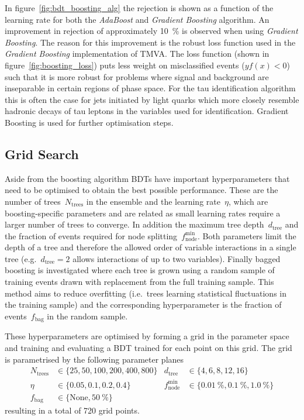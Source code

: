 In figure~\ref{fig:bdt_boosting_alg} the rejection is shown as a function of the
learning rate for both the \emph{AdaBoost} and \emph{Gradient Boosting}
algorithm. An improvement in rejection of approximately \SI{10}{\percent} is
observed when using \emph{Gradient Boosting}. The reason for this improvement is
the robust loss function used in the \emph{Gradient Boosting} implementation of
TMVA. The loss function (shown in figure~\ref{fig:boosting_loss}) puts less
weight on misclassified events ($y f(x) < 0$) such that it is more robust for
problems where signal and background are inseparable in certain regions of phase
space. For the tau identification algorithm this is often the case for jets
initiated by light quarks which more closely resemble hadronic decays of tau
leptons in the variables used for identification. Gradient Boosting is used for
further optimisation steps.

\subsection{Grid Search}
\label{sec:bdt_grid_search}
Aside from the boosting algorithm BDTs have important hyperparameters that need
to be optimised to obtain the best possible performance. These are the number of
trees~$N_\text{trees}$ in the ensemble and the learning rate~$\eta$, which are
boosting-specific parameters and are related as small learning rates require a
larger number of trees to converge. In addition the maximum tree
depth~$d_\text{tree}$ and the fraction of events required for node
splitting~$f_\text{node}^\text{min}$. Both parameters limit the depth of a tree
and therefore the allowed order of variable interactions in a single tree (e.g.\
$d_\text{tree} = 2$ allows interactions of up to two variables). Finally bagged
boosting is investigated where each tree is grown using a random sample of
training events drawn with replacement from the full training sample. This
method aims to reduce overfitting (i.e.\ trees learning statistical fluctuations
in the training sample) and the corresponding hyperparameter is the fraction of
events~$f_\text{bag}$ in the random sample.

These hyperparameters are optimised by forming a grid in the parameter space and
training and evaluating a BDT trained for each point on this grid. The grid is
parametrised by the following parameter planes
\begin{align*}
  N_\mathrm{trees} &\in \{25, 50, 100, 200, 400, 800\} &
  d_\mathrm{tree} &\in \{4, 6, 8, 12, 16\} \\
  \eta &\in \{0.05, 0.1, 0.2, 0.4\} &
  f_\mathrm{node}^\mathrm{min} &\in \{\SI{0.01}{\percent}, \SI{0.1}{\percent},\SI{1.0}{\percent}\} \\
  f_\text{bag} &\in \{\text{None}, \SI{50}{\percent} \}
\end{align*}
resulting in a total of 720 grid points.


